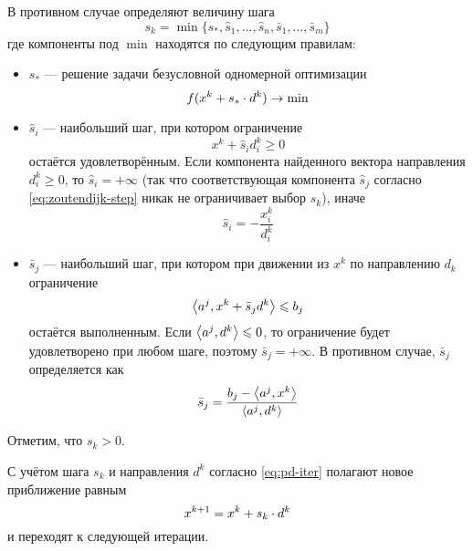 \begin{ssteps}
  В противном случае определяют величину шага
  \begin{equation}
    \label{eq:zoutendijk-step}
    s_k =
    \min\{s_*,\hat{s}_1,\dotsc,\hat{s}_n,\bar{s}_1,\dotsc,\bar{s}_m\}
  \end{equation}
  где компоненты под $\min$ находятся по следующим правилам:
  \begin{itemize}
  \item $s_*$ — решение задачи безусловной одномерной оптимизации
    \begin{equation} 
      \label{eq:zoutendijk-1optim}
      f(x^k+s_* \cdot d^k) \to \min
    \end{equation}

  \item $\hat{s}_i$ — наибольший шаг, при котором ограничение
    \begin{equation*}
      x^k+\hat{s}_i d^k_i \geq 0
    \end{equation*}
    остаётся удовлетворённым. Если компонента найденного вектора
    направления $d^k_i \geq 0$, то $\hat{s}_i = +\infty$ (так что
    соответствующая компонента $\hat{s}_j$ согласно
    \eqref{eq:zoutendijk-step} никак не ограничивает выбор $s_k$),
    иначе
    \begin{equation*}
      \hat{s}_i = -\frac{x^k_i}{d^k_i}
    \end{equation*}

  \item $\bar{s}_j$ — наибольший шаг, при котором при движении из
    $x^k$ по направлению $d_k$ ограничение
    \begin{equation*}
      {\left \langle a^j, x^k+\bar{s}_j d^k \right \rangle} \leqslant b_j
    \end{equation*}
    остаётся выполненным. Если ${\left \langle a^j, d^k \right \rangle} \leqslant 0$, то
    ограничение будет удовлетворено при любом шаге, поэтому $\bar{s}_j
    = +\infty$. В противном случае, $\bar{s}_j$ определяется как
    \begin{equation*}
      \bar{s}_j = \frac{b_j-{\left \langle a^j, x^k \right \rangle}}{{\left \langle a^j, d^k \right \rangle}}
    \end{equation*}
  \end{itemize}
  Отметим, что $s_k>0$.
\item С учётом шага $s_k$ и направления $d^k$ согласно
  \eqref{eq:pd-iter} полагают новое приближение равным
  \begin{equation*}
    x^{k+1} = x^k + s_k \cdot d^k
  \end{equation*}
  и переходят к следующей итерации.
\end{ssteps}

